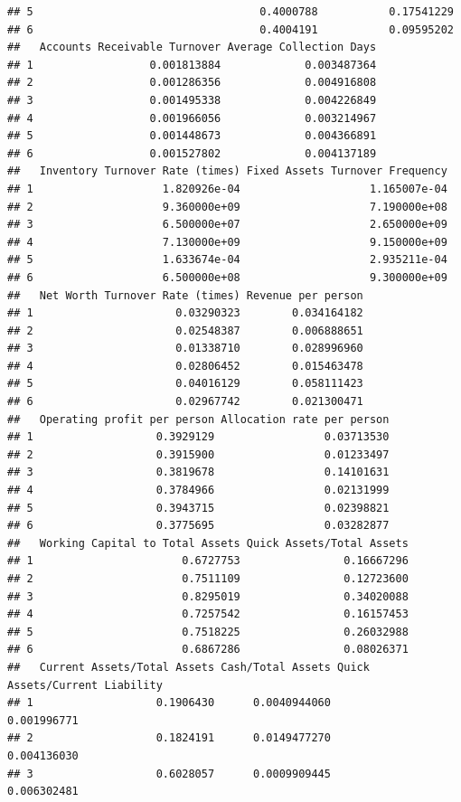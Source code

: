\documentclass[
]{book}
\begin{document}
\begin{verbatim}
## 5                                   0.4000788           0.17541229
## 6                                   0.4004191           0.09595202
##   Accounts Receivable Turnover Average Collection Days
## 1                  0.001813884             0.003487364
## 2                  0.001286356             0.004916808
## 3                  0.001495338             0.004226849
## 4                  0.001966056             0.003214967
## 5                  0.001448673             0.004366891
## 6                  0.001527802             0.004137189
##   Inventory Turnover Rate (times) Fixed Assets Turnover Frequency
## 1                    1.820926e-04                    1.165007e-04
## 2                    9.360000e+09                    7.190000e+08
## 3                    6.500000e+07                    2.650000e+09
## 4                    7.130000e+09                    9.150000e+09
## 5                    1.633674e-04                    2.935211e-04
## 6                    6.500000e+08                    9.300000e+09
##   Net Worth Turnover Rate (times) Revenue per person
## 1                      0.03290323        0.034164182
## 2                      0.02548387        0.006888651
## 3                      0.01338710        0.028996960
## 4                      0.02806452        0.015463478
## 5                      0.04016129        0.058111423
## 6                      0.02967742        0.021300471
##   Operating profit per person Allocation rate per person
## 1                   0.3929129                 0.03713530
## 2                   0.3915900                 0.01233497
## 3                   0.3819678                 0.14101631
## 4                   0.3784966                 0.02131999
## 5                   0.3943715                 0.02398821
## 6                   0.3775695                 0.03282877
##   Working Capital to Total Assets Quick Assets/Total Assets
## 1                       0.6727753                0.16667296
## 2                       0.7511109                0.12723600
## 3                       0.8295019                0.34020088
## 4                       0.7257542                0.16157453
## 5                       0.7518225                0.26032988
## 6                       0.6867286                0.08026371
##   Current Assets/Total Assets Cash/Total Assets Quick Assets/Current Liability
## 1                   0.1906430      0.0040944060                    0.001996771
## 2                   0.1824191      0.0149477270                    0.004136030
## 3                   0.6028057      0.0009909445                    0.006302481

\end{verbatim}
\end{document}
